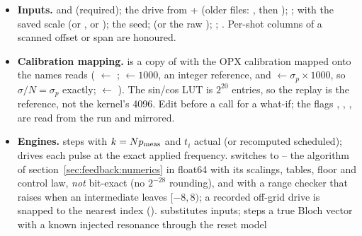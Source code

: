 \begin{itemize}[nosep]
  \item \textbf{Inputs.}  and  (required);
    the drive from  +  (older files:
    , then ); ; 
    with the saved scale (or , or );
    the seed;  (or the raw );
    ; . Per-shot columns of a
    scanned offset or span are honoured.
  \item \textbf{Calibration mapping.}  is a copy of  with
    the OPX calibration mapped onto the names  reads
    ( $\leftarrow$ ;
     $\leftarrow 1000$, an integer reference, and
     $\leftarrow \sigma_p \times 1000$, so
    $\sigma/N = \sigma_p$ exactly;  $\leftarrow$
    ). The sin/cos LUT is $2^{20}$ entries, so the replay is the
    reference, not the kernel's 4096. Edit  before a call for a
    what-if; the flags ,
    , ,
     are read from the run and mirrored.
  \item \textbf{Engines.}  steps 
    with $k = N p_{\rm meas}$ and $t_i$ actual (or recomputed scheduled);
     drives each pulse at the exact applied frequency.
     switches to
     -- the algorithm of
    section~\ref{sec:feedback:numerics} in float64 with its scalings, tables,
    floor and control law, \emph{not} bit-exact (no $2^{-28}$ rounding), and with
     a range checker that raises
     when an intermediate leaves $[-8, 8)$; a
    recorded off-grid drive is snapped to the nearest index
    ().
     substitutes inputs;  steps a true
    Bloch vector with a known injected resonance through the reset model

\end{itemize}
